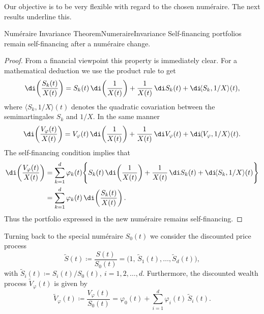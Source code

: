 Our objective is to be very flexible with regard to the chosen num\'{e}raire. The next results underline this.

\begin{prop}{Num\'{e}raire Invariance Theorem}{NumeraireInvariance}
	Self-financing portfolios remain self-financing after a num\'{e}raire change.
\end{prop}

\begin{proof}
	From a financial viewpoint this property is immediately clear. For a mathematical deduction we use the product rule to get
	\begin{equation}\label{eq:ProductRuleSkOverX}
		\di\!\left(\frac{S_k(t)}{X(t)}\right)
		= S_k(t)\,\di\!\left(\frac{1}{X(t)}\right)
		+ \frac{1}{X(t)}\,\di S_k(t)
		+ \di\!\langle S_k, 1/X \rangle (t),
	\end{equation}
	where $\langle S_k, 1/X \rangle (t)$ denotes the quadratic covariation between the semimartingales $S_k$ and $1/X$. In the same manner
	\begin{equation}\label{eq:ProductRuleVphiOverX}
		\di\!\left(\frac{V_{\varphi}(t)}{X(t)}\right)
		= V_{\varphi}(t)\,\di\!\left(\frac{1}{X(t)}\right)
		+ \frac{1}{X(t)}\,\di V_{\varphi}(t)
		+ \di\!\langle V_{\varphi}, 1/X \rangle (t).
	\end{equation}
	The self-financing condition implies that
	\begin{align}\label{eq:SelfFinancingUnderNumeraireChange}
		\di\!\left(\frac{V_{\varphi}(t)}{X(t)}\right)
		 & = \sum_{k=1}^{d} \varphi_k(t)\Bigg\{
		S_k(t)\,\di\!\left(\frac{1}{X(t)}\right)
		+ \frac{1}{X(t)}\,\di S_k(t)
		+ \di\!\langle S_k, 1/X \rangle (t)
		\Bigg\}                                                                            \\
		 & = \sum_{k=1}^{d} \varphi_k(t)\,\di\!\left(\frac{S_k(t)}{X(t)}\right). \nonumber
	\end{align}
	Thus the portfolio expressed in the new num\'{e}raire remains self-financing. \qedhere
\end{proof}

Turning back to the special num\'{e}raire \(S_0(t)\) we consider the discounted price process
\begin{equation}\label{eq:DiscountedPriceVectorByS0}
	\widetilde{S}(t) \coloneqq \frac{S(t)}{S_0(t)} = \bigl(1,\,\widetilde{S}_1(t),\dots,\widetilde{S}_d(t)\bigr),
\end{equation}
with \(\widetilde{S}_i(t) \coloneqq S_i(t)/S_0(t),\ i=1,2,\dots,d.\) Furthermore, the discounted wealth process \( \widetilde{V}_{\varphi}(t)\) is given by
\begin{equation}\label{eq:DiscountedWealthByS0}
	\widetilde{V}_{\varphi}(t) \coloneqq \frac{V_{\varphi}(t)}{S_0(t)}
	= \varphi_0(t) + \sum_{i=1}^{d} \varphi_i(t)\,\widetilde{S}_i(t).
\end{equation}

